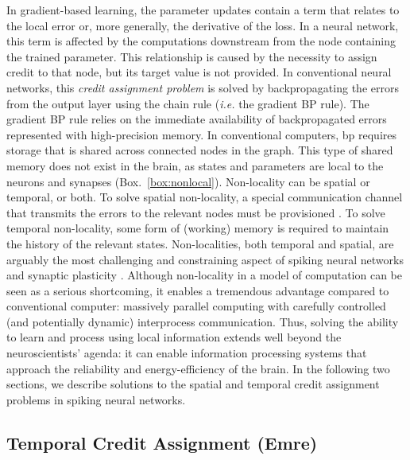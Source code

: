 \documentclass[journal,onecolumn,11pt]{IEEEtran}
\newcommand{\refbox}[1]{{\color{blue!70}(Box.~\ref{#1})}}
\begin{document}
In gradient-based learning, the parameter updates contain a term that relates to the local error or, more generally, the derivative of the loss.
In a neural network, this term is affected by the computations downstream from the node containing the trained parameter.
This relationship is caused by the necessity to assign credit to that node, but its target value is not provided.
In conventional neural networks, this \emph{credit assignment problem} is solved by backpropagating the errors from the output layer using the chain rule (\emph{i.e.} the gradient BP rule).
The gradient BP rule relies on the immediate availability of backpropagated errors represented with high-precision memory.
In conventional computers, \Gls{bp} requires storage that is shared across connected nodes in the graph.
This type of shared memory does not exist in the brain, as states and parameters are local to the neurons and synapses \refbox{box:nonlocal}.
Non-locality can be spatial or temporal, or both.
To solve spatial non-locality, a special communication channel that transmits the errors to the relevant nodes must be provisioned \cite{Baldi_Sadowski16_theoloca}. 
To solve temporal non-locality, some form of (working) memory is required to maintain the history of the relevant states. 
Non-localities, both temporal and spatial, are arguably the most challenging and constraining aspect of spiking neural networks and synaptic plasticity \cite{Neftci18_datapowe}. 
Although non-locality in a model of computation can be seen as a serious shortcoming, it enables a tremendous advantage compared to conventional computer: massively parallel computing with carefully controlled (and potentially dynamic) interprocess communication. 
Thus, solving the ability to learn and process using local information extends well beyond the neuroscientists' agenda: it can enable information processing systems that approach the reliability and energy-efficiency of the brain.
In the following two sections, we describe solutions to the spatial and temporal credit assignment problems in spiking neural networks.

\subsection{Temporal Credit Assignment (Emre)}
\end{document}
